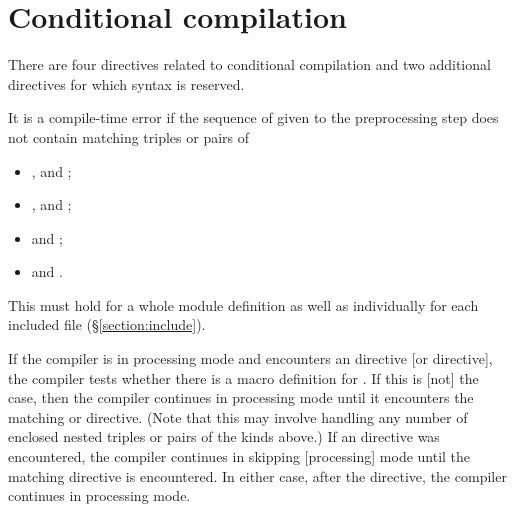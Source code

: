 \section{Conditional compilation}

\label{section:condcomp}

There are four directives related to conditional compilation and two additional
directives for which syntax is reserved.

\begin{rules}
       {\TXT{-}  \TXT{(}  \TXT{)} }
       {\TXT{-}  \TXT{(}  \TXT{)} }
       {\TXT{-}  }
       {\TXT{-}  }
\end{rules}

It is a compile-time error if the sequence of  given
to the preprocessing step does not contain matching triples or pairs
of
\begin{itemize}
\item {},  and ;
\item {},  and ;
\item {} and ;
\item {} and .
\end{itemize}
This must hold for a whole module definition as well as individually for each
included file (\S\ref{section:include}).

If the compiler is in processing mode and
encounters an  directive [or  directive],
the compiler tests whether there is a
macro definition for .  If this is [not] the case, then the compiler continues in
processing mode until it encounters the matching  or  directive.  (Note that this
may involve handling any number of enclosed nested triples or pairs of the kinds above.)
If an  directive was encountered, the compiler continues in skipping [processing] mode until the
matching  directive is encountered.  In either case, after the  directive,
the compiler continues in processing mode.

